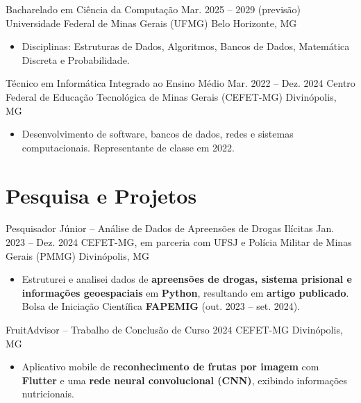 \documentclass[10pt,a4paper]{article}
\begin{document}
\entry
{Bacharelado em Ciência da Computação}
{Mar. 2025 -- 2029 (previsão)}
{Universidade Federal de Minas Gerais (UFMG)}
{Belo Horizonte, MG}

\begin{itemize}
    \item Disciplinas: Estruturas de Dados, Algoritmos, Bancos de Dados, Matemática Discreta e Probabilidade.
\end{itemize}

\entry
{Técnico em Informática Integrado ao Ensino Médio}
{Mar. 2022 -- Dez. 2024}
{Centro Federal de Educação Tecnológica de Minas Gerais (CEFET-MG)}
{Divinópolis, MG}

\begin{itemize}
    \item Desenvolvimento de software, bancos de dados, redes e sistemas computacionais. Representante de classe em 2022.
\end{itemize}

\section*{Pesquisa e Projetos}

\entry
{Pesquisador Júnior -- Análise de Dados de Apreensões de Drogas Ilícitas}
{Jan. 2023 -- Dez. 2024}
{CEFET-MG, em parceria com UFSJ e Polícia Militar de Minas Gerais (PMMG)}
{Divinópolis, MG}

\begin{itemize}

    \item Estruturei e analisei dados de \textbf{apreensões de drogas, sistema prisional e informações
    geoespaciais} em \textbf{Python}, resultando em \textbf{artigo publicado}. Bolsa de Iniciação Científica
    \textbf{FAPEMIG} (out. 2023 -- set. 2024).

\end{itemize}

\entry
{FruitAdvisor -- Trabalho de Conclusão de Curso}
{2024}
{CEFET-MG}
{Divinópolis, MG}

\begin{itemize}

    \item Aplicativo mobile de \textbf{reconhecimento de frutas por imagem} com \textbf{Flutter} e uma \textbf{rede neural convolucional (CNN)}, exibindo informações nutricionais.

\end{itemize}
\end{document}
